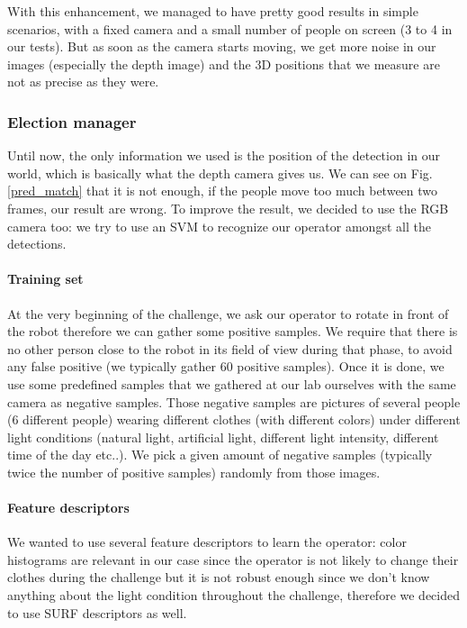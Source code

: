 \documentclass[a4paper, twocolumn]{article}
\begin{document}
    With this enhancement, we managed to have pretty good results in simple scenarios, with a fixed camera and a small number of people on screen (3 to 4 in our tests). But as soon as the camera starts moving, we get more noise in our images (especially the depth image) and the 3D positions that we measure are not as precise as they were.

    \subsubsection{Election manager}
    
    Until now, the only information we used is the position of the detection in our world, which is basically what the depth camera gives us. We can see on Fig. \ref{pred_match} that it is not enough, if the people move too much between two frames, our result are wrong. To improve the result, we decided to use the RGB camera too: we try to use an SVM to recognize our operator amongst all the detections.
    
    \paragraph{Training set} At the very beginning of the challenge, we ask our operator to rotate in front of the robot therefore we can gather some positive samples. We require that there is no other person close to the robot in its field of view during that phase, to avoid any false positive (we typically gather 60 positive samples). Once it is done, we use some predefined samples that we gathered at our lab ourselves with the same camera as negative samples. Those negative samples are pictures of several people (6 different people) wearing different clothes (with different colors) under different light conditions (natural light, artificial light, different light intensity, different time of the day etc..). We pick a given amount of negative samples (typically twice the number of positive samples) randomly from those images.
    
    \paragraph{Feature descriptors} We wanted to use several feature descriptors to learn the operator: color histograms are relevant in our case since the operator is not likely to change their clothes during the challenge but it is not robust enough since we don't know anything about the light condition throughout the challenge, therefore we decided to use SURF descriptors \cite{BAY2008346} as well. 
    
\end{document}
